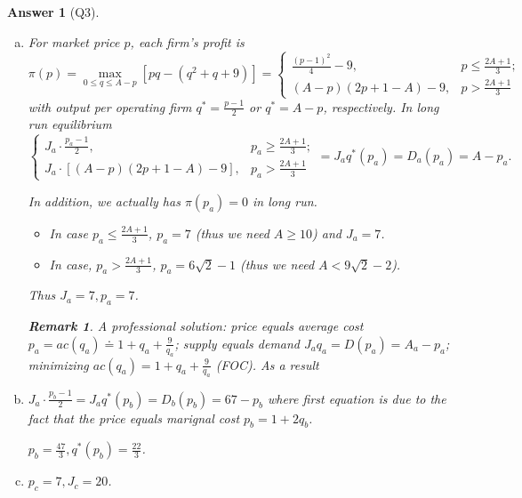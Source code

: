 \documentclass{article}
\newtheorem*{ans}{Answer}
\newtheorem{rem}{\bf Remark}
\newcommand{\1}{{\bf 1}}
\newcommand{\0}{{\mathbf{0}}}
\newcommand{\<}{\langle}
\renewcommand{\>}{\rangle}
\begin{document}
\begin{ans}[Q3] \begin{enumerate}[(a)]
		\item For market price $p$, each firm's profit is 
		$$\pi (p)  = \max_{0 \le q \le A - p} \left[pq - \left(q^2+q+9\right)\right]  = \left\{
		\begin{array}{cc} \frac{(p - 1)^2}4 - 9 , & p \le \frac{2A + 1}{3}; \\ (A-p) (2p +1 - A) - 9, & p >\frac{2A+ 1}{3}
		\end{array}
		\right. $$ with output per operating firm $q^* = \frac{p-1}2$ or $q^* =A-p $, respectively. In long run equilibrium 
		\begin{equation}\left\{ \begin{array}{cc}
		J_a \cdot \frac{p_a - 1 }{2}, & p_a \ge \frac{2A+1}3; \\  J_a \cdot [(A-p) (2p+ 1 - A) - 9], & p_a >\frac{2A+ 1}{3}
		\end{array} \right.  = J_a q^*(p_a)= D_a (p_a) = A -p_a.
		\end{equation}
		
		In addition, we actually has $\pi(p_a) = 0$ in long run.
		\begin{itemize}
			\item In case $p_a \le \frac{ 2A +1 }{3}$, $p_a = 7$ (thus we need $A \ge 10$) and $J_a = 7$.
			\item In case, $p_a > \frac{2A+1}3$, $p_a = 6 \sqrt{2} - 1$ (thus we need $A < 9 \sqrt2 - 2$).
		\end{itemize}
Thus $J_a = 7, p_a = 7$.
\begin{rem}
	A professional solution: price equals average cost $p_a = ac(q_a) \doteq 1  + q_a + \frac9{q_a}$; supply equals demand $J_a q_a = D(p_a) = A_a-p_a$; minimizing $ac(q_a) =  1  + q_a + \frac9{q_a}$ (FOC).
	As a result $ $
\end{rem}
		\item $ J_a \cdot \frac{p_b - 1 }{2}   = J_a q^*(p_b) = D_b\left( p_ b \right) = 67 - p_b$ where first equation is due to the fact that the price equals marignal cost $p_b = 1+2q_b$.
		
		$p_b = \frac{47}3, q^*\left( p_b \right) = \frac{22}3$.
		\item $p_c = 7, J_c = 20 $.
	\end{enumerate}
\end{ans}
\end{document}
